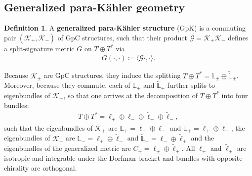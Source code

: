 \documentclass[letterpaper,12pt]{article}
\newcommand{\TT}{{T\oplus T^*}}
\newcommand{\KK}{\mathcal{K}}
\newcommand{\GG}{\mathcal{G}}
\newcommand{\Lb}{\mathbb{L}}
\newcommand{\ellt}{{\tl{\ell}}}
\newcommand{\la}{\langle}
\newcommand{\ra}{\rangle}
\def\tl{\tilde}
\theoremstyle{definition}
\newtheorem{Def}[theorem]{Definition}
\theoremstyle{remark}
\theoremstyle{examples}
\begin{document}
\subsection{Generalized para-K\"ahler geometry}\label{sec:GpK}
\begin{Def}
A \textbf{generalized para-K\"ahler structure} (GpK) is a commuting pair $(\KK_+,\KK_-)$ of GpC structures, such that their product $\GG=\KK_+\KK_-$ defines a split-signature metric $G$ on $\TT$ via
\begin{align*}
G(\cdot,\cdot)\coloneqq \la \GG\cdot,\cdot\ra.
\end{align*}
\end{Def}

Because $\KK_\pm$ are GpC structures, they induce the splitting $\TT= \Lb_\pm\oplus\widetilde{\Lb}_\pm$. Moreover, because they commute, each of $\Lb_+$ and $\widetilde{\Lb}_+$ further splits to eigenbundles of $\KK_-$, so that one arrives at the decomposition of $\TT$ into four bundles:
\begin{align}\label{GpK_bundles}
\TT=\ell_+\oplus\ell_-\oplus \ellt_+\oplus \ellt_-,
\end{align}
such that the eigenbundles of $\KK_+$ are $\Lb_+=\ell_+\oplus\ell_-$ and $\tl{\Lb}_+=\ellt_+\oplus \ellt_-$, the eigenbundles of $\KK_-$ are $\Lb_-=\ell_+\oplus\ellt_-$ and $\tl{\Lb}_-=\ell_-\oplus \ellt_+$ and the eigenbundles of the generalized metric are $C_\pm=\ell_\pm\oplus\ellt_\pm$. All $\ell_\pm$ and $\ellt_\pm$ are isotropic and integrable under the Dorfman bracket \cite{Hu:2019zro} and bundles with opposite chirality are orthogonal.
\end{document}
